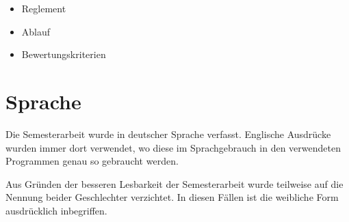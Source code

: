 \begin{itemize}
    \item Reglement \cite{hsz_reglement}
    \item Ablauf \cite{hsz_ablauf}
    \item Bewertungskriterien \cite{hsz_bewertungskriterien}
\end{itemize}

\section{Sprache}
Die Semesterarbeit wurde in deutscher Sprache verfasst. Englische Ausdrücke 
wurden immer dort verwendet, wo diese im Sprachgebrauch in den verwendeten 
Programmen genau so gebraucht werden.

Aus Gründen der besseren Lesbarkeit der Semesterarbeit wurde teilweise auf 
die Nennung beider Geschlechter verzichtet. In diesen Fällen ist die 
weibliche Form ausdrücklich inbegriffen.